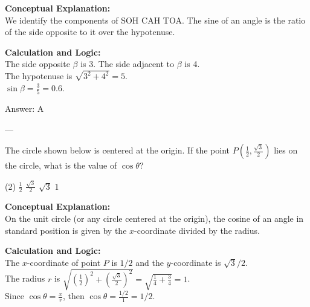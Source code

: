 \documentclass[11pt,paper=a4,answers]{exam}
\begin{document}
\begin{questions}
\begin{solution}
\textbf{Conceptual Explanation:} \\
We identify the components of SOH CAH TOA. The sine of an angle is the ratio of the side opposite to it over the hypotenuse.

\vspace{10pt}
\textbf{Calculation and Logic:} \\
The side opposite $\beta$ is 3. The side adjacent to $\beta$ is 4. \\
The hypotenuse is $\sqrt{3^2 + 4^2} = 5$. \\
$\sin \beta = \frac{3}{5} = 0.6$.

\vspace{15pt}
Answer: \colorbox{yellow!100}{A}
\end{solution}

---

\question
The circle shown below is centered at the origin. If the point $P(\frac{1}{2}, \frac{\sqrt{3}}{2})$ lies on the circle, what is the value of $\cos \theta$?
\begin{center}
\end{center}
\begin{tasks}(2)
    \task $\frac{1}{2}$
    \task $\frac{\sqrt{3}}{2}$
    \task $\sqrt{3}$
    \task $1$
\end{tasks}

\begin{solution}
\textbf{Conceptual Explanation:} \\
On the unit circle (or any circle centered at the origin), the cosine of an angle in standard position is given by the $x$-coordinate divided by the radius.

\vspace{10pt}
\textbf{Calculation and Logic:} \\
The $x$-coordinate of point $P$ is $1/2$ and the $y$-coordinate is $\sqrt{3}/2$. \\
The radius $r$ is $\sqrt{(\frac{1}{2})^2 + (\frac{\sqrt{3}}{2})^2} = \sqrt{\frac{1}{4} + \frac{3}{4}} = 1$. \\
Since $\cos \theta = \frac{x}{r}$, then $\cos \theta = \frac{1/2}{1} = 1/2$.


\end{solution}
\end{questions}
\end{document}
